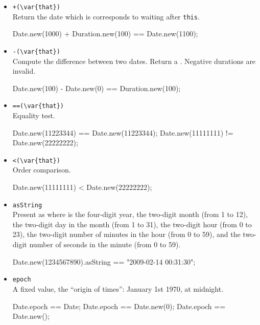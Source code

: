 \begin{itemize}
\item \lstinline|+(\var{that})|\\
  Return the date which is corresponds to waiting 
   after \lstinline|this|.
\begin{urbiassert}[firstnumber=last]
Date.new(1000) + Duration.new(100) == Date.new(1100);
\end{urbiassert}

\item \lstinline|-(\var{that})|\\
  Compute the difference between two dates.  Return a
  .  Negative durations are invalid.
\begin{urbiassert}[firstnumber=last]
Date.new(100) - Date.new(0) == Duration.new(100);
\end{urbiassert}

\item \lstinline|==(\var{that})|\\
  Equality test.
\begin{urbiassert}[firstnumber=last]
Date.new(11223344) == Date.new(11223344);
Date.new(11111111) != Date.new(22222222);
\end{urbiassert}

\item \lstinline|<(\var{that})|\\
  Order comparison.
\begin{urbiassert}[firstnumber=last]
Date.new(11111111) < Date.new(22222222);
\end{urbiassert}

\item \lstinline|asString|\\
  Present as  where  is the four-digit
  year,  the two-digit month (from 1 to 12),  the
  two-digit day in the month (from 1 to 31),  the two-digit
  hour (from 0 to 23),  the two-digit number of minutes in the
  hour (from 0 to 59), and  the two-digit number of seconds in
  the minute (from 0 to 59).
\begin{urbiassert}[firstnumber=last]
Date.new(1234567890).asString == "2009-02-14 00:31:30";
\end{urbiassert}

\item \lstinline|epoch|\\
  A fixed value, the ``origin of times'': January 1st 1970, at
  midnight.
\begin{urbiassert}[firstnumber=last]
Date.epoch == Date;
Date.epoch == Date.new(0);
Date.epoch == Date.new();
\end{urbiassert}


\end{itemize}


